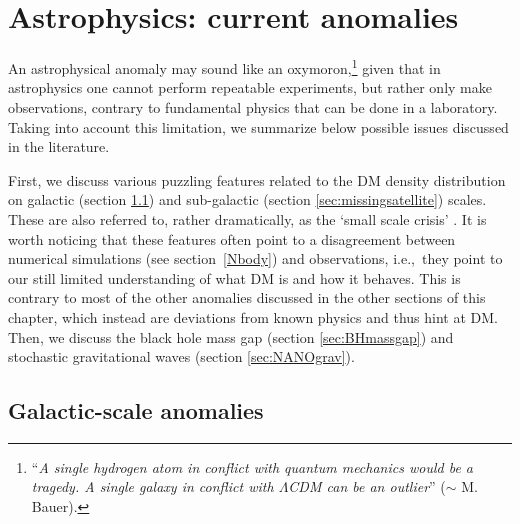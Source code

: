 \section{Astrophysics: current anomalies}
\label{sec:astroanomaly}
\label{CDMproblems} 

An astrophysical anomaly may sound like an oxymoron,\footnote{ ``{\em A single hydrogen atom in conflict with quantum mechanics would be a tragedy. A single galaxy in conflict with {\rm $\Lambda$CDM} can be an outlier}'' ($\sim$ M. Bauer).} given that in astrophysics one cannot perform repeatable experiments, but rather only make observations, contrary to fundamental physics that can be done in a laboratory. Taking into account this limitation, we summarize below possible issues discussed in the literature.

\medskip

First, we discuss various puzzling features related to the DM density distribution on galactic (section \ref{sec:cuspcore}) and sub-galactic (section \ref{sec:missingsatellite}) scales. These are also referred to, rather dramatically, as the `small scale crisis' \cite{DM:density:anomalies}. 
It is worth noticing that these features often point to a disagreement between numerical simulations (see section~\ref{Nbody}) and observations, i.e.,~they  point to our still limited understanding of what DM is and how it behaves. This is contrary to most of the other anomalies discussed in the other sections of this chapter, which instead are deviations from known physics and thus hint at DM.
Then, we discuss the black hole mass gap (section \ref{sec:BHmassgap}) and stochastic gravitational waves (section \ref{sec:NANOgrav}).

\subsection{Galactic-scale anomalies} \label{sec:cuspcore}

